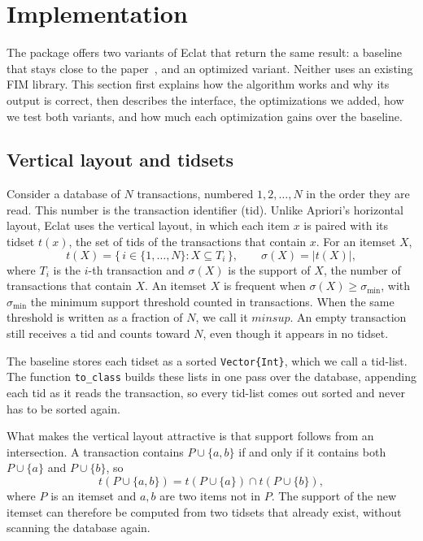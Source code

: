 \section{Implementation}
\label{sec:implementation}
The package offers two variants of Eclat that return the same result: a baseline that
stays close to the paper~\cite{zaki2000}, and an optimized variant. Neither uses an
existing FIM library. This section first explains how the algorithm works and why its
output is correct, then describes the interface, the optimizations we added, how we test
both variants, and how much each optimization gains over the baseline.

\subsection{Vertical layout and tidsets}
\label{sec:vertical}
Consider a database of $N$ transactions, numbered $1, 2, \dots, N$ in the order they are
read. This number is the transaction identifier (tid). Unlike Apriori's horizontal
layout, Eclat uses the vertical layout, in which each item $x$ is paired with its tidset
$t(x)$, the set of tids of the transactions that contain $x$. For an itemset $X$,
\begin{equation}
  t(X) = \{\, i \in \{1,\dots,N\} : X \subseteq T_i \,\}, \qquad
  \sigma(X) = |t(X)|,
  \label{eq:support}
\end{equation}
where $T_i$ is the $i$-th transaction and $\sigma(X)$ is the support of $X$, the number
of transactions that contain $X$. An itemset $X$ is frequent when
$\sigma(X) \ge \sigma_{\min}$, with $\sigma_{\min}$ the minimum support threshold
counted in transactions. When the same threshold is written as a fraction of $N$, we call
it $\mathit{minsup}$. An empty transaction still receives a tid and counts toward $N$,
even though it appears in no tidset.

The baseline stores each tidset as a sorted \texttt{Vector\{Int\}}, which we call a
tid-list. The function \texttt{to\_class} builds these lists in one pass over the
database, appending each tid as it reads the transaction, so every tid-list comes out
sorted and never has to be sorted again.

What makes the vertical layout attractive is that support follows from an intersection.
A transaction contains
$P \cup \{a, b\}$ if and only if it contains both $P \cup \{a\}$ and $P \cup \{b\}$, so
\begin{equation}
  t(P \cup \{a, b\}) = t(P \cup \{a\}) \cap t(P \cup \{b\}),
  \label{eq:intersect}
\end{equation}
where $P$ is an itemset and $a, b$ are two items not in $P$. The support of the new
itemset can therefore be computed from two tidsets that already exist, without scanning
the database again.

